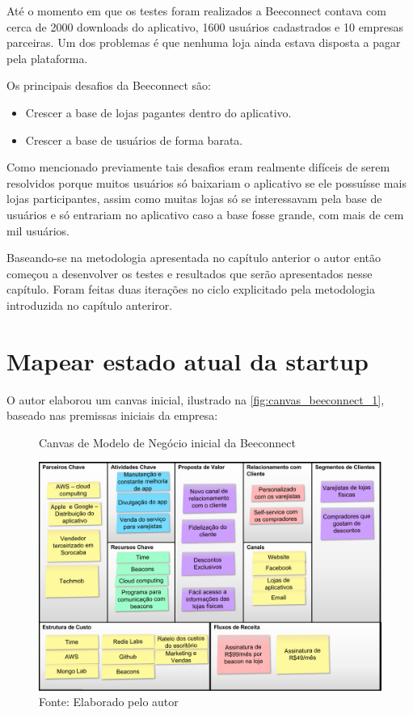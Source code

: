 Até o momento em que os testes foram realizados a Beeconnect contava com cerca de 2000 downloads do aplicativo, 1600 usuários cadastrados e 10 empresas parceiras. Um dos problemas é que nenhuma loja ainda estava disposta a pagar pela plataforma.

Os principais desafios da Beeconnect são:
\begin{itemize}
\item Crescer a base de lojas pagantes dentro do aplicativo.
\item Crescer a base de usuários de forma barata.
\end{itemize}

Como mencionado previamente tais desafios eram realmente difíceis de serem resolvidos porque muitos usuários só baixariam o aplicativo se ele possuísse mais lojas participantes, assim como muitas lojas só se interessavam pela base de usuários e só entrariam no aplicativo caso a base fosse grande, com mais de cem mil usuários.

Baseando-se na metodologia apresentada no capítulo anterior o autor então começou a desenvolver os testes e resultados que serão apresentados nesse capítulo. Foram feitas duas iterações no ciclo explicitado pela metodologia introduzida no capítulo anteriror.

\section{Mapear estado atual da startup}
\label{cha:mapear_estado}
O autor elaborou um canvas inicial, ilustrado na \autoref{fig:canvas_beeconnect_1}, baseado nas premissas iniciais da empresa: 

\begin{figure}[H]
\caption{Canvas de Modelo de Negócio inicial da Beeconnect}
\centerline{\includegraphics[scale=0.25]{img/canvas_beeconnect_1}}
\label{fig:canvas_beeconnect_1}
\caption* {Fonte: Elaborado pelo autor}
\end{figure}

